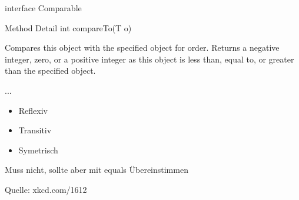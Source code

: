 \documentclass[18pt]{beamer}
\begin{document}
\begin{frame}{interface Comparable}
 \begin{exampleblock}{Method Detail}
int compareTo(T o)

Compares this object with the specified object for order. Returns a negative integer, zero, or a positive integer as this object is less than, equal to, or greater than the specified object. 

...
 \end{exampleblock}
 \begin{itemize}
  \item Reflexiv
  \item Transitiv
  \item Symetrisch
 \end{itemize}
Muss nicht, sollte aber mit equals Übereinstimmen
\end{frame}



\begin{frame}
 
 \tiny{Quelle: xkcd.com/1612}
\end{frame}
\end{document}
